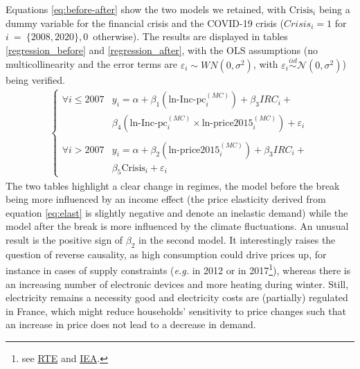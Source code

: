 Equations \eqref{eq:before-after} show the two models we retained, with $\text{Crisis}_i$ being a dummy variable for the financial crisis and the COVID-19 crisis (${Crisis}_i = 1$ for $i~=~\{2008, 2020\}, 0$~otherwise). The results are displayed in tables \ref{regression_before} and \ref{regression_after}, with the OLS assumptions (no multicollinearity and the error terms are $\varepsilon_i \sim WN(0, \sigma^2)$, {with} $\varepsilon_i \overset{iid}{\sim} \mathcal{N}(0, \sigma^2)$) being verified.
\begin{align} \label{eq:before-after}
    \begin{cases}
        \forall i \leq 2007 & y_i = \alpha + \beta_1 \left(\text{ln-Inc-pc}_i^{(MC)}\right) + \beta_3 IRC_i + \\ & \beta_4 \left(\text{ln-Inc-pc}_i^{(MC)} \times \text{ln-price2015}_i^{(MC)}\right) + \varepsilon_i \\
        \\
        \forall i > 2007 & y_i = \alpha + \beta_2 \left(\text{ln-price2015}_i^{(MC)}\right) + \beta_3 IRC_i + \\ & \beta_5 \text{Crisis}_i + \varepsilon_i
    \end{cases} 
\end{align}
The two tables highlight a clear change in regimes, the model before the break being more influenced by an income effect (the price elasticity derived from equation \eqref{eq:elast} is slightly negative and denote an inelastic demand) while the model after the break is more influenced by the climate fluctuations. An unusual result is the positive sign of $\beta_2$ in the second model. It interestingly raises the question of reverse causality, as high consumption could drive prices up, for instance in cases of supply constraints (\textit{e.g.} in 2012 or in 2017\footnote{see \href{http://publications.elia.be/upload/UG_upload/5SQMH9Z4FF.pdf}{RTE} and \href{https://www.nucnet.org/news/as-france-faces-winter-supply-constraints-iea-says-renewables-cannot-replace-nuclear}{IEA}.}), whereas there is an increasing number of electronic devices and more heating during winter. Still, electricity remains a necessity good and electricity costs are (partially) regulated in France, which might reduce households' sensitivity to price changes such that an increase in price does not lead to a decrease in demand.

